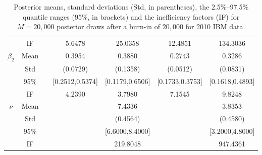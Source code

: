 \begin{table}
\begin{footnotesize}
\begin{singlespace}
\begin{tabular}{ccc cccc }
 & IF  &  &  5.6478  &  25.0358  &  12.4851  &  134.3036  \\ [1.0ex] 
 $\beta_2$   & Mean   &  &  0.3954  &  0.3880  &  0.2743  &  0.3286  \\  
 & Std   &  &  (0.0729)  &  (0.1358)  &  (0.0512)  &  (0.0831)  \\  
 & 95\%  &  &  [0.2512,0.5374]  &  [0.1179,0.6506]  &  [0.1733,0.3753]  &  [0.1618,0.4893]  \\  
 & IF  &  &  4.2390  &  3.7980  &  7.1545  &  9.8248  \\ [1.0ex] 
 $\nu$   & Mean   &  &  &  7.4336  &    &  3.8353  \\  
 & Std   &  &     &  (0.4564)  &     &  (0.4580)  \\  
 & 95\%  &  &    &  [6.6000,8.4000]  &   &  [3.2000,4.8000]  \\  
 & IF  &  &   &  219.8048  &    &  947.4361  \\ [1.0ex] 
\bottomrule 
\end{tabular}
\end{singlespace}
\end{footnotesize}
 \caption{Posterior means, standard deviations (Std, in parentheses), 
the 2.5\%--97.5\% quantile ranges (95\%, in brackets) and  the inefficiency factors (IF)  for $M=20,000$ posterior draws after a burn-in of $20,000$ 
for 2010 IBM data.}
\label{tab:sim_res_2010_IBM} 
\end{table}
